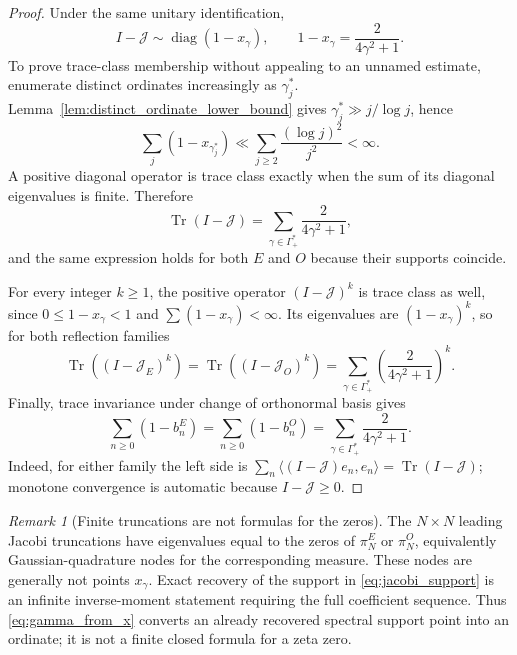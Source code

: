 \documentclass[preprint,12pt]{elsarticle}
\numberwithin{equation}{section}
\theoremstyle{plain}
\theoremstyle{definition}
\theoremstyle{remark}
\newtheorem{remark}[theorem]{Remark}
\begin{document}
\begin{proof}
Under the same unitary identification,
\begin{equation}
I-\mathcal J\sim\operatorname{diag}(1-x_\gamma),
\qquad
1-x_\gamma=\frac{2}{4\gamma^2+1}.
\label{eq:one_minus_xgamma}
\end{equation}
To prove trace-class membership without appealing to an unnamed estimate, enumerate distinct ordinates increasingly as $\gamma_j^*$.  Lemma~\ref{lem:distinct_ordinate_lower_bound} gives
$\gamma_j^*\gg j/\log j$, hence
\begin{equation}
\sum_j(1-x_{\gamma_j^*})
\ll\sum_{j\ge2}\frac{(\log j)^2}{j^2}<\infty.
\end{equation}
A positive diagonal operator is trace class exactly when the sum of its diagonal eigenvalues is finite.  Therefore
\begin{equation}
\operatorname{Tr}(I-\mathcal J)
=\sum_{\gamma\in\Gamma_+^*}\frac{2}{4\gamma^2+1},
\label{eq:Jacobi_trace_formula}
\end{equation}
and the same expression holds for both $E$ and $O$ because their supports coincide.

For every integer $k\ge1$, the positive operator $(I-\mathcal J)^k$ is trace class as well, since
$0\le1-x_\gamma<1$ and $\sum(1-x_\gamma)<\infty$.  Its eigenvalues are $(1-x_\gamma)^k$, so for both reflection families
\begin{equation}
\operatorname{Tr}\!\left((I-\mathcal J_E)^k\right)
=\operatorname{Tr}\!\left((I-\mathcal J_O)^k\right)
=\sum_{\gamma\in\Gamma_+^*}\left(\frac{2}{4\gamma^2+1}\right)^k.
\label{eq:Jacobi_trace_powers}
\end{equation}
Finally, trace invariance under change of orthonormal basis gives
\begin{equation}
\sum_{n\ge0}(1-b_n^E)
=\sum_{n\ge0}(1-b_n^O)
=\sum_{\gamma\in\Gamma_+^*}\frac{2}{4\gamma^2+1}.
\label{eq:Jacobi_diagonal_trace}
\end{equation}
Indeed, for either family the left side is $\sum_n\langle(I-\mathcal J)e_n,e_n\rangle=\operatorname{Tr}(I-\mathcal J)$; monotone convergence is automatic because $I-\mathcal J\ge0$.
\end{proof}

\begin{remark}[Finite truncations are not formulas for the zeros]
\label{rem:finite_jacobi_not_zeros}
The $N\times N$ leading Jacobi truncations have eigenvalues equal to the zeros of $\pi_N^E$ or $\pi_N^O$, equivalently Gaussian-quadrature nodes for the corresponding measure. These nodes are generally not points $x_\gamma$. Exact recovery of the support in \eqref{eq:jacobi_support} is an infinite inverse-moment statement requiring the full coefficient sequence. Thus \eqref{eq:gamma_from_x} converts an already recovered spectral support point into an ordinate; it is not a finite closed formula for a zeta zero.
\end{remark}
\end{document}
